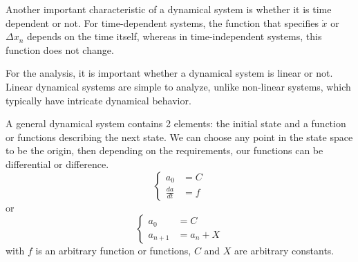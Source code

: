 \documentclass[a4paper]{article}
\begin{document}
Another important characteristic of a dynamical system is whether it is time dependent or not.
For time-dependent systems, the function that specifies \(\dot{x}\) or \(\Delta{x_n}\) depends on the time itself, whereas in time-independent systems, this function does not change.

For the analysis, it is important whether a dynamical system is linear or not.
Linear dynamical systems are simple to analyze, unlike non-linear systems, which typically have intricate dynamical behavior.

A general dynamical system contains 2 elements: the initial state and a function or functions describing the next state.
We can choose any point in the state space to be the origin, then depending on the requirements, our functions can be differential or difference.
\begin{equation*}
  \begin{cases}
    a_0           & = C \\
    \frac{da}{dt} & = f
  \end{cases}
\end{equation*}
or
\begin{equation*}
  \begin{cases}
    a_0       & = C       \\
    a_{n + 1} & = a_n + X
  \end{cases}
\end{equation*}
with \(f\) is an arbitrary function or functions, \(C\) and \(X\) are arbitrary constants.
\end{document}
